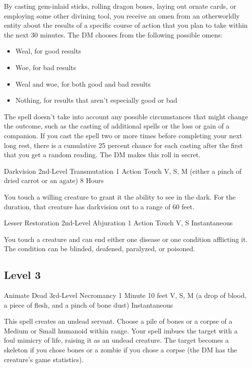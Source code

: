 {By casting gem-inlaid sticks, rolling dragon bones, laying out ornate cards, or employing some other divining tool, you receive an omen from an otherworldly entity about the results of a specific course of action that you plan to take within the next 30 minutes. The DM chooses from the following possible omens:
\begin{itemize}
	\item Weal, for good results
	\item Woe, for bad results
	\item Weal and woe, for both good and bad results
	\item Nothing, for results that aren’t especially good or bad
\end{itemize}
The spell doesn’t take into account any possible circumstances that might change the outcome, such as the casting of additional spells or the loss or gain of a companion. If you cast the spell two or more times before completing your next long rest, there is a cumulative 25 percent chance for each casting after the first that you get a random reading. The DM makes this roll in secret.

\DndSpellHeader
  {Darkvision}
  {2nd-Level Transmutation}
  {1 Action}
  {Touch}
  {V, S, M (either a pinch of dried carrot or an agate)}
  {8 Hours}

You touch a willing creature to grant it the ability to see in the dark. For the duration, that creature has darkvision out to a range of 60 feet.

\DndSpellHeader
  {Lesser Restoration}
  {2nd-Level Abjuration}
  {1 Action}
  {Touch}
  {V, S}
  {Instantaneous}

You touch a creature and can end either one disease or one condition afflicting it. The condition can be blinded, deafened, paralyzed, or poisoned.

\subsection*{Level 3}

\DndSpellHeader
  {Animate Dead}
  {3rd-Level Necromancy}
  {1 Minute}
  {10 feet}
  {V, S, M (a drop of blood, a piece of flesh, and a pinch of bone dust)}
  {Instantaneous}

This spell creates an undead servant. Choose a pile of bones or a corpse of a Medium or Small humanoid within range. Your spell imbues the target with a foul mimicry of life, raising it as an undead creature. The target becomes a skeleton if you chose bones or a zombie if you chose a corpse (the DM has the creature's game statistics).

}
